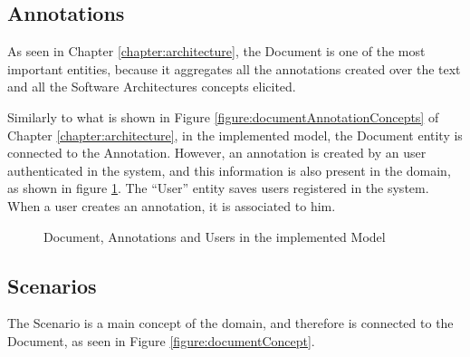 \subsection{Annotations}
\label{subsection:modelAnnotations}
As seen in Chapter \ref{chapter:architecture}, the Document is one of the most important entities, because it aggregates all the annotations created over the text and all the Software Architectures concepts elicited.

Similarly to what is shown in Figure \ref{figure:documentAnnotationConcepts} of Chapter \ref{chapter:architecture}, in the implemented model, the Document entity is connected to the Annotation. However, an annotation is created by an user authenticated in the system, and this information is also present in the domain, as shown in figure \ref{figure:modelDocUserAnnot}. The ``User'' entity saves users registered in the system. When a user creates an annotation, it is associated to him.

\begin{figure}
\centering
\renewcommand {\umltextcolor}{black}
\renewcommand {\umlfillcolor}{none}
\renewcommand {\umldrawcolor}{black}

\caption{Document, Annotations and Users in the implemented Model}
\label{figure:modelDocUserAnnot}
\end{figure} 
 
\subsection{Scenarios}
\label{subsection:modelScenarios}
The Scenario is a main concept of the domain, and therefore is connected to the Document, as seen in Figure \ref{figure:documentConcept}. 

